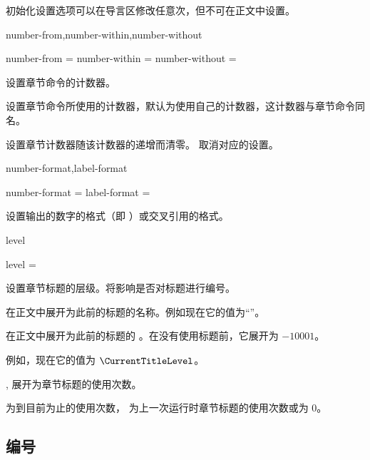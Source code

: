 \documentclass{cusdoc}
\begin{document}
初始化设置选项可以在导言区修改任意次，但不可在正文中设置。

\begin{keyval}[path=title/...]{number-from,number-within,number-without}
  \begin{syntax}
    number-from    = 
    number-within  = 
    number-without = 
  \end{syntax}
设置章节命令的计数器。

 设置章节命令所使用的计数器，默认为使用自己的计数器，这计数器与章节命令同名。

 设置章节计数器随该计数器的递增而清零。 取消对应的设置。
\end{keyval}

\begin{keyval}[path=title/...]{number-format,label-format}
  \begin{syntax}
    number-format = 
    label-format  = 
  \end{syntax}
设置输出的数字的格式（即 ）或交叉引用的格式。
\end{keyval}

\begin{keyval}[path=title/...]{level}
  \begin{syntax}
    level = 
  \end{syntax}
设置章节标题的层级。将影响是否对标题进行编号。
\end{keyval}

\begin{function}[EXP]{\CurrentTitleName}
在正文中展开为此前的标题的名称。例如现在它的值为“\CurrentTitleName”。
\end{function}

\begin{function}[EXP]{\CurrentTitleLevel}
在正文中展开为此前的标题的 。在没有使用标题前，它展开为 $-10001$。

例如，现在它的值为 $ \CurrentTitleLevel $。
\end{function}

\begin{function}[EXP]{\thetitlecount,\PreviousTitleCount}
展开为章节标题的使用次数。

 为到目前为止的使用次数，
 为上一次运行时章节标题的使用次数或为 0。
\end{function}

\subsection{编号}
\end{document}

